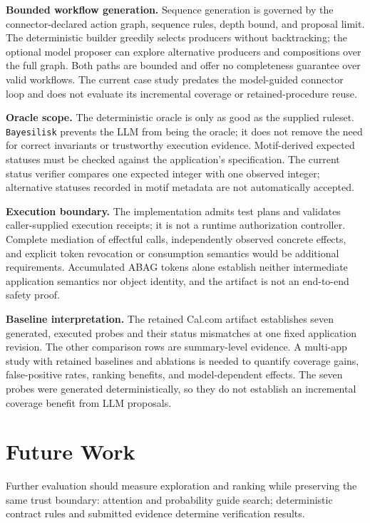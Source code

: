 \documentclass[10pt]{article}
\newcommand{\tool}{\texttt{Bayesilisk}\xspace}
\begin{document}
\textbf{Bounded workflow generation.} Sequence generation is governed by the
connector-declared action graph, sequence rules, depth bound, and proposal
limit. The deterministic builder greedily selects producers without backtracking;
the optional model proposer can explore alternative producers and compositions
over the full graph. Both paths are bounded and offer no completeness guarantee
over valid workflows. The current case study predates the model-guided connector
loop and does not evaluate its incremental coverage or retained-procedure reuse.

\textbf{Oracle scope.} The deterministic oracle is only as good as the supplied
ruleset. \tool prevents the LLM from being the oracle; it does not remove the
need for correct invariants or trustworthy execution evidence. Motif-derived
expected statuses must be checked against the application's specification.
The current status verifier compares one expected integer with one observed
integer; alternative statuses recorded in motif metadata are not automatically
accepted.

\textbf{Execution boundary.} The implementation admits test plans and validates
caller-supplied execution receipts; it is not a runtime authorization controller.
Complete mediation of effectful calls, independently observed concrete effects,
and explicit token revocation or consumption semantics would be additional
requirements. Accumulated ABAG tokens alone establish neither intermediate
application semantics nor object identity, and the artifact is not an end-to-end
safety proof.

\textbf{Baseline interpretation.} The retained Cal.com artifact establishes
seven generated, executed probes and their status mismatches at one fixed
application revision. The other comparison rows are summary-level evidence.
A multi-app study with retained baselines and ablations is needed to quantify
coverage gains, false-positive rates, ranking benefits, and model-dependent
effects. The seven probes were generated deterministically, so they do not
establish an incremental coverage benefit from LLM proposals.

\section{Future Work}

Further evaluation should measure exploration and ranking while preserving the
same trust boundary: attention and probability guide search; deterministic
contract rules and submitted evidence determine verification results.
\end{document}
